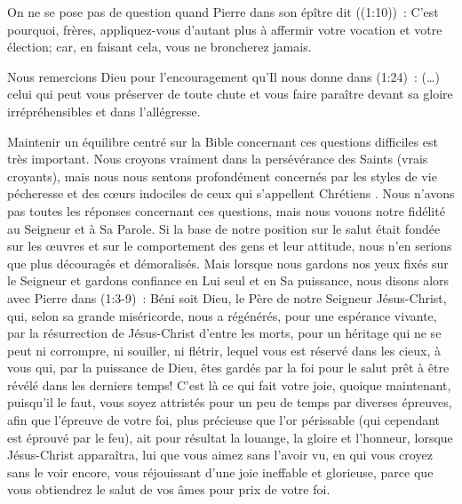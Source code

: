 \begin{enumerate}
On ne se pose pas de question quand Pierre dans son épître dit ((1:10))~:
 \og C'est pourquoi, frères, appliquez-vous d'autant plus à affermir votre vocation et votre élection;
 car, en faisant cela, vous ne broncherez jamais. \fg{}

Nous remercions Dieu pour l'encouragement qu'Il nous donne dans (1:24)~:
 \og (\dots{}) celui qui peut vous préserver de toute chute et vous faire paraître
 devant sa gloire irrépréhensibles et dans l'allégresse. \fg{}

Maintenir un équilibre centré sur la Bible concernant ces questions difficiles est très important.
 Nous croyons vraiment dans la persévérance des Saints (vrais croyants),
 mais nous nous sentons profondément concernés par les styles de vie pécheresse et des cœurs indociles
 de ceux qui s'appellent \og Chrétiens \fg{}.
 Nous n'avons pas toutes les réponses concernant ces questions, mais nous vouons notre fidélité au Seigneur
 et à Sa Parole. Si la base de notre position sur le salut était fondée sur les œuvres
 et sur le comportement des gens et leur attitude, nous n'en serions que plus découragés et démoralisés.
 Mais lorsque nous gardons nos yeux fixés sur le Seigneur et gardons confiance en Lui seul
 et en Sa puissance, nous disons alors avec Pierre dans (1:3-9)~:
 \og Béni soit Dieu, le Père de notre Seigneur Jésus-Christ, qui, selon sa grande miséricorde,
 nous a régénérés, pour une espérance vivante, par la résurrection de Jésus-Christ d'entre les morts,
 pour un héritage qui ne se peut ni corrompre, ni souiller, ni flétrir,
 lequel vous est réservé dans les cieux, à vous qui, par la puissance de Dieu,
 êtes gardés par la foi pour le salut prêt à être révélé dans les derniers temps!
 C'est là ce qui fait votre joie, quoique maintenant, puisqu'il le faut,
 vous soyez attristés pour un peu de temps par diverses épreuves, afin que l'épreuve de votre foi,
 plus précieuse que l'or périssable (qui cependant est éprouvé par le feu),
 ait pour résultat la louange, la gloire et l'honneur, lorsque Jésus-Christ apparaîtra,
 lui que vous aimez sans l'avoir vu, en qui vous croyez sans le voir encore,
 vous réjouissant d'une joie ineffable et glorieuse,
 parce que vous obtiendrez le salut de vos âmes pour prix de votre foi. \fg{}


\end{enumerate}

